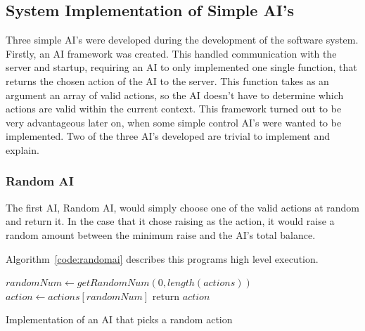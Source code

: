 \newpage{}

\subsection{System Implementation of Simple AI's}\label{section:ai}
Three simple AI's were developed during the development of the software system.
Firstly, an AI framework was created. This handled communication with the
server and startup, requiring an AI to only implemented one single function,
that returns the chosen action of the AI to the server. This function takes
as an argument an array of valid actions, so the AI doesn't have to determine
which actions are valid within the current context. This framework turned out
to be very advantageous later on, when some simple control AI's were wanted
to be implemented. Two of the three AI's developed are trivial to implement
and explain.

\subsubsection{Random AI}\label{section:randomai}

The first AI, Random AI, would simply choose one of the valid actions at
random and return it. In the case that it chose raising as the action, it
would raise a random amount between the minimum raise and the AI's total
balance.

Algorithm~\ref{code:randomai} describes this programs high level execution.

\vspace{0.3cm}

\begin{algorithm}[H]
    \BlankLine{}
     $randomNum \leftarrow getRandomNum(0, length(actions))$\;
     $action \leftarrow actions[randomNum]$\;
     
     return $action$\;
\caption{Implementation of an AI that picks a random action}%
\label{code:randomai}
\end{algorithm}

\vspace{0.3cm}

